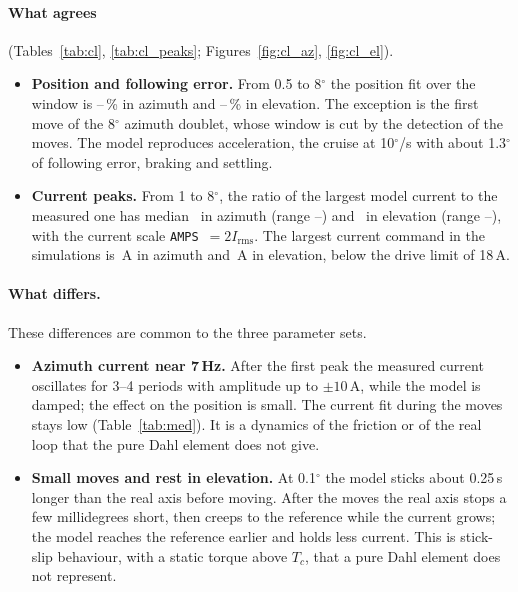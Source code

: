\documentclass[10pt,a4paper]{article}
\numberwithin{equation}{section}
\begin{document}
\paragraph{What agrees} (Tables~\ref{tab:cl}, \ref{tab:cl_peaks}; Figures~\ref{fig:cl_az}, \ref{fig:cl_el}).
\begin{itemize}
\item \textbf{Position and following error.} From 0.5 to 8$^\circ$ the position fit over the window is \clFitMinA--\clFitMaxA\,\% in azimuth and \clFitMinP--\clFitMaxP\,\% in elevation. The exception is the first move of the 8$^\circ$ azimuth doublet, whose window is cut by the detection of the moves. The model reproduces acceleration, the cruise at 10$^\circ$/s with about 1.3$^\circ$ of following error, braking and settling.
\item \textbf{Current peaks.} From 1 to 8$^\circ$, the ratio of the largest model current to the measured one has median \iRatioMedA\ in azimuth (range \iRatioMinA--\iRatioMaxA) and \iRatioMedP\ in elevation (range \iRatioMinP--\iRatioMaxP), with the current scale \texttt{AMPS}~$=2I_\mathrm{rms}$. The largest current command in the simulations is \icmdMaxA\,A in azimuth and \icmdMaxP\,A in elevation, below the drive limit of 18\,A.
\end{itemize}

\paragraph{What differs.} These differences are common to the three parameter sets.
\begin{itemize}
\item \textbf{Azimuth current near 7\,Hz.} After the first peak the measured current oscillates for 3--4 periods with amplitude up to $\pm10$\,A, while the model is damped; the effect on the position is small. The current fit during the moves stays low (Table~\ref{tab:med}). It is a dynamics of the friction or of the real loop that the pure Dahl element does not give.
\item \textbf{Small moves and rest in elevation.} At 0.1$^\circ$ the model sticks about 0.25\,s longer than the real axis before moving. After the moves the real axis stops a few millidegrees short, then creeps to the reference while the current grows; the model reaches the reference earlier and holds less current. This is stick-slip behaviour, with a static torque above $T_c$, that a pure Dahl element does not represent.
\end{itemize}
\end{document}
